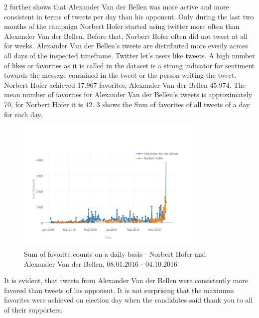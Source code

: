 \documentclass{llncs}
\begin{document}
\figurename{2} further shows that Alexander Van der Bellen was more active and more consistent in terms of tweets per day than his opponent. Only during the last two months of the campaign Norbert Hofer started using twitter more often than Alexander Van der Bellen. Before that, Norbert Hofer often did not tweet at all for weeks. Alexander Van der Bellen's tweets are distributed more evenly across all days of the inspected timeframe. 
\newpage
Twitter let's users like tweets. A high number of likes or favorites as it is called in the dataset is a strong indicator for sentiment towards the message contained in the tweet or the person writing the tweet. Norbert Hofer achieved 17.967 favorites, Alexander Van der Bellen 45.974. The mean number of favorites for Alexander Van der Bellen's tweets is approximately 70, for Norbert Hofer it is 42.  \figurename{3} shows the Sum of favorites of all tweets of a day for each day. 
\begin{figure}[htbp] 
	\centering
	\includegraphics[width=0.8\textwidth]{grafics/favourite.png}
	\caption{Sum of favorite counts on a daily basis - Norbert Hofer and Alexander Van der Bellen, 08.01.2016 - 04.10.2016}
	\label{fig:Sum of favorites on a daily basis}
\end{figure}

It is evident, that tweets from Alexander Van der Bellen were consistently more favored than tweets of his opponent. It is not surprising that the maximum favorites were achieved on election day when the candidates said thank you to all of their supporters. 
\end{document}
